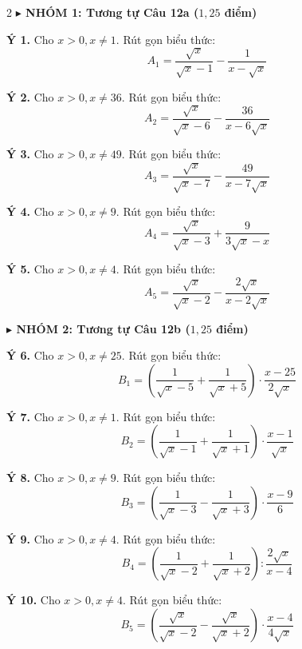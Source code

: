 \documentclass[12pt,a4paper]{article}
\begin{document}
\vspace{1.5mm}

\vspace{0.8mm}

\begin{multicols}{2}
\noindent\textbf{\color{accentred}$\blacktriangleright$ NHÓM 1: Tương tự Câu 12a ($1{,}25$ điểm)}
\vspace{1mm}

\noindent\textbf{Ý 1.} Cho $x > 0, x \ne 1$. Rút gọn biểu thức:
$$A_1 = \dfrac{\sqrt{x}}{\sqrt{x} - 1} - \dfrac{1}{x - \sqrt{x}}$$

\noindent\textbf{Ý 2.} Cho $x > 0, x \ne 36$. Rút gọn biểu thức:
$$A_2 = \dfrac{\sqrt{x}}{\sqrt{x} - 6} - \dfrac{36}{x - 6\sqrt{x}}$$

\noindent\textbf{Ý 3.} Cho $x > 0, x \ne 49$. Rút gọn biểu thức:
$$A_3 = \dfrac{\sqrt{x}}{\sqrt{x} - 7} - \dfrac{49}{x - 7\sqrt{x}}$$

\noindent\textbf{Ý 4.} Cho $x > 0, x \ne 9$. Rút gọn biểu thức:
$$A_4 = \dfrac{\sqrt{x}}{\sqrt{x} - 3} + \dfrac{9}{3\sqrt{x} - x}$$

\noindent\textbf{Ý 5.} Cho $x > 0, x \ne 4$. Rút gọn biểu thức:
$$A_5 = \dfrac{\sqrt{x}}{\sqrt{x} - 2} - \dfrac{2\sqrt{x}}{x - 2\sqrt{x}}$$

\columnbreak

\noindent\textbf{\color{accentred}$\blacktriangleright$ NHÓM 2: Tương tự Câu 12b ($1{,}25$ điểm)}
\vspace{1mm}

\noindent\textbf{Ý 6.} Cho $x > 0, x \ne 25$. Rút gọn biểu thức:
$$B_1 = \left(\dfrac{1}{\sqrt{x} - 5} + \dfrac{1}{\sqrt{x} + 5}\right) \cdot \dfrac{x - 25}{2\sqrt{x}}$$

\noindent\textbf{Ý 7.} Cho $x > 0, x \ne 1$. Rút gọn biểu thức:
$$B_2 = \left(\dfrac{1}{\sqrt{x} - 1} + \dfrac{1}{\sqrt{x} + 1}\right) \cdot \dfrac{x - 1}{\sqrt{x}}$$

\noindent\textbf{Ý 8.} Cho $x > 0, x \ne 9$. Rút gọn biểu thức:
$$B_3 = \left(\dfrac{1}{\sqrt{x} - 3} - \dfrac{1}{\sqrt{x} + 3}\right) \cdot \dfrac{x - 9}{6}$$

\noindent\textbf{Ý 9.} Cho $x > 0, x \ne 4$. Rút gọn biểu thức:
$$B_4 = \left(\dfrac{1}{\sqrt{x} - 2} + \dfrac{1}{\sqrt{x} + 2}\right) : \dfrac{2\sqrt{x}}{x - 4}$$

\noindent\textbf{Ý 10.} Cho $x > 0, x \ne 4$. Rút gọn biểu thức:
$$B_5 = \left(\dfrac{\sqrt{x}}{\sqrt{x} - 2} - \dfrac{\sqrt{x}}{\sqrt{x} + 2}\right) \cdot \dfrac{x - 4}{4\sqrt{x}}$$

\end{multicols}
\end{document}
